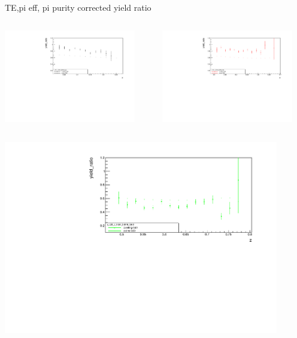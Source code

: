 \begin{frame}{TE,pi eff, pi purity corrected yield ratio}
\begin{columns}
\begin{column}[T]{0.5\textwidth}
\includegraphics[width = 0.9\textwidth]{results/yield/statistics_corr/x_Q2_z_50_3979_40_ratio.pdf}
\end{column}
\begin{column}[T]{0.5\textwidth}
\includegraphics[width = 0.9\textwidth]{results/yield/statistics_corr/x_Q2_z_50_3979_50_ratio.pdf}
\end{column}
\end{columns}
\begin{columns}
\begin{column}[T]{0.5\textwidth}
\includegraphics[width = 0.9\textwidth]{results/yield/statistics_corr/x_Q2_z_50_3979_60_ratio.pdf}

\end{column}
\end{columns}
\end{frame}
